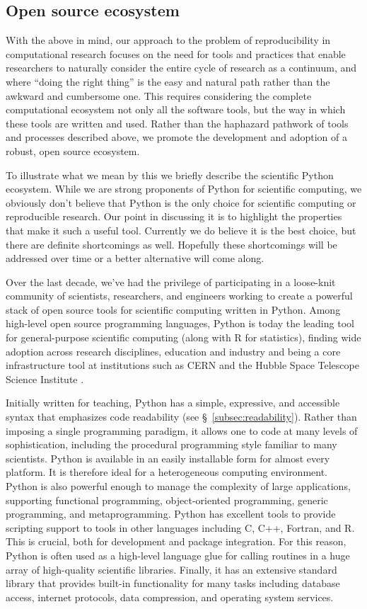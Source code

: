 \documentclass[ChapterTOCs,krantz2]{krantz} %
\begin{document}
\subsection{Open source ecosystem}

With the above in mind, our approach to the problem of reproducibility in
computational research focuses on the need for tools and practices that enable
researchers to naturally consider the entire cycle of research as a continuum,
and where ``doing the right thing'' is the easy and natural path rather than
the awkward and cumbersome one. This requires considering the complete
computational ecosystem not only all the software tools, but the way in which
these tools are written and used. Rather than the haphazard pathwork of tools
and processes described above, we promote the development and adoption of a
robust, open source ecosystem.

To illustrate what we mean by this we briefly describe the scientific Python
ecosystem.  While we are strong proponents of Python for scientific computing,
we obviously don't believe that Python is the only choice for scientific
computing or reproducible research. Our point in discussing it is to highlight
the properties that make it such a useful tool. Currently we do believe it is
the best choice, but there are definite shortcomings as well.  Hopefully these
shortcomings will be addressed over time or a better alternative will come
along.

Over the last decade, we've had the privilege of participating in a loose-knit
community of scientists, researchers, and engineers working to create a
powerful stack of open source tools for scientific computing written in Python.
Among high-level open source programming languages, Python is today the leading
tool for general-purpose scientific computing (along with R for statistics),
finding wide adoption across research disciplines, education and industry and
being a core infrastructure tool at institutions such as CERN and the Hubble
Space Telescope Science Institute
\cite{millman2011python,Perez2011,ganga09,SST}.

Initially written for teaching, Python has a simple, expressive, and accessible
syntax that emphasizes code readability (see §~\ref{subsec:readability}).
Rather than imposing a single programming paradigm, it allows one to code at
many levels of sophistication, including the procedural programming style
familiar to many scientists. Python is available in an easily installable form
for almost every platform. It is therefore ideal for a heterogeneous computing
environment. Python is also powerful enough to manage the complexity of large
applications, supporting functional programming, object-oriented programming,
generic programming, and metaprogramming.  Python has excellent tools to
provide scripting support to tools in other languages including C, C++,
Fortran, and R. This is crucial, both for development and package integration.
For this reason, Python is often used as a high-level language glue for calling
routines in a huge array of high-quality scientific libraries. Finally, it
has an extensive standard library that provides built-in functionality for
many tasks including database access, internet protocols, data compression,
and operating system services.
\end{document}
